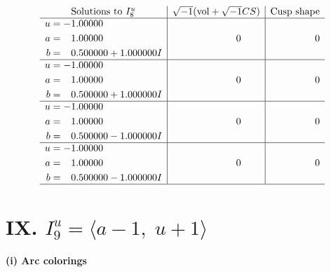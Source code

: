 \documentclass[1p]{elsarticle_modified}
\theoremstyle{definition}
\newcommand{\I}{\sqrt{-1}}
\begin{document}
$$\begin{array}{c|c|c}  
\text{Solutions to }I^u_{8}& \I (\text{vol} + \sqrt{-1}CS) & \text{Cusp shape}\\
 \hline 
\begin{aligned}
u &= -1.00000\phantom{ +0.000000I} \\
a &= \phantom{-}1.00000\phantom{ +0.000000I} \\
b &= \phantom{-}0.500000 + 1.000000 I\end{aligned}
 & \phantom{-0.000000 } 0 & \phantom{-0.000000 } 0 \\ \hline\begin{aligned}
u &= -1.00000\phantom{ +0.000000I} \\
a &= \phantom{-}1.00000\phantom{ +0.000000I} \\
b &= \phantom{-}0.500000 + 1.000000 I\end{aligned}
 & \phantom{-0.000000 } 0 & \phantom{-0.000000 } 0 \\ \hline\begin{aligned}
u &= -1.00000\phantom{ +0.000000I} \\
a &= \phantom{-}1.00000\phantom{ +0.000000I} \\
b &= \phantom{-}0.500000 - 1.000000 I\end{aligned}
 & \phantom{-0.000000 } 0 & \phantom{-0.000000 } 0 \\ \hline\begin{aligned}
u &= -1.00000\phantom{ +0.000000I} \\
a &= \phantom{-}1.00000\phantom{ +0.000000I} \\
b &= \phantom{-}0.500000 - 1.000000 I\end{aligned}
 & \phantom{-0.000000 } 0 & \phantom{-0.000000 } 0\\
 \hline 
 \end{array}$$\newpage\newpage\renewcommand{\arraystretch}{1}
\centering \section*{IX. $I^u_{9}= \langle a-1,\;u+1 \rangle$}
\flushleft \textbf{(i) Arc colorings}\\
\end{document}
